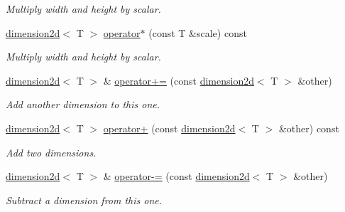 \begin{DoxyCompactItemize}
\begin{DoxyCompactList}\small\item\em Multiply width and height by scalar. \end{DoxyCompactList}\item 
\mbox{\label{classirr_1_1core_1_1dimension2d_a93c0e2bc5492325febfe9b5703bfc75d}} 
\hyperlink{classirr_1_1core_1_1dimension2d}{dimension2d}$<$ T $>$ \hyperlink{classirr_1_1core_1_1dimension2d_a93c0e2bc5492325febfe9b5703bfc75d}{operator$\ast$} (const T \&scale) const
\begin{DoxyCompactList}\small\item\em Multiply width and height by scalar. \end{DoxyCompactList}\item 
\mbox{\label{classirr_1_1core_1_1dimension2d_ae233386e59e95f213367922f7638bc46}} 
\hyperlink{classirr_1_1core_1_1dimension2d}{dimension2d}$<$ T $>$ \& \hyperlink{classirr_1_1core_1_1dimension2d_ae233386e59e95f213367922f7638bc46}{operator+=} (const \hyperlink{classirr_1_1core_1_1dimension2d}{dimension2d}$<$ T $>$ \&other)
\begin{DoxyCompactList}\small\item\em Add another dimension to this one. \end{DoxyCompactList}\item 
\mbox{\label{classirr_1_1core_1_1dimension2d_a128002f9610d1647fd8617ab7187e9a9}} 
\hyperlink{classirr_1_1core_1_1dimension2d}{dimension2d}$<$ T $>$ \hyperlink{classirr_1_1core_1_1dimension2d_a128002f9610d1647fd8617ab7187e9a9}{operator+} (const \hyperlink{classirr_1_1core_1_1dimension2d}{dimension2d}$<$ T $>$ \&other) const
\begin{DoxyCompactList}\small\item\em Add two dimensions. \end{DoxyCompactList}\item 
\mbox{\label{classirr_1_1core_1_1dimension2d_af5bb67163a3cdbcbceb9eda015382bfe}} 
\hyperlink{classirr_1_1core_1_1dimension2d}{dimension2d}$<$ T $>$ \& \hyperlink{classirr_1_1core_1_1dimension2d_af5bb67163a3cdbcbceb9eda015382bfe}{operator-\/=} (const \hyperlink{classirr_1_1core_1_1dimension2d}{dimension2d}$<$ T $>$ \&other)
\begin{DoxyCompactList}\small\item\em Subtract a dimension from this one. \end{DoxyCompactList}\item 

\end{DoxyCompactItemize}
